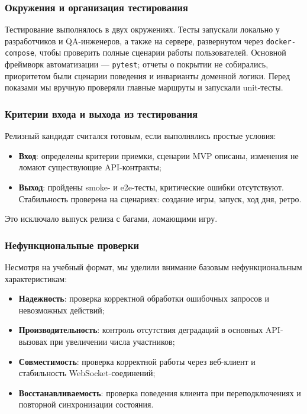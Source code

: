 \subsubsection{Окружения и организация тестирования}

Тестирование выполнялось в двух окружениях. Тесты запускали локально у разработчиков и QA-инженеров, а также на сервере, развернутом через \texttt{docker-compose}, чтобы проверить полные сценарии работы пользователей. Основной фреймворк автоматизации --- \texttt{pytest}; отчеты о покрытии не собирались, приоритетом были сценарии поведения и инварианты доменной логики. Перед показами мы вручную проверяли главные маршруты и запускали unit-тесты. 

\subsubsection{Критерии входа и выхода из тестирования} 
Релизный кандидат считался готовым, если выполнялись простые условия:

\begin{itemize}
    \item \textbf{Вход}: определены критерии приемки, сценарии MVP описаны, изменения не ломают существующие API-контракты;
    \item \textbf{Выход}: пройдены smoke- и e2e-тесты, критические ошибки отсутствуют. Стабильность проверена на сценариях: создание игры, запуск, ход дня, ретро.
\end{itemize} 
Это исключало выпуск релиза с багами, ломающими игру. 

\subsubsection{Нефункциональные проверки} 
Несмотря на учебный формат, мы уделили внимание базовым нефункциональным характеристикам:

\begin{itemize}
    \item \textbf{Надежность}: проверка корректной обработки ошибочных запросов и невозможных действий;
    \item \textbf{Производительность}: контроль отсутствия деградаций в основных API-вызовах при увеличении числа участников;
    \item \textbf{Совместимость}: проверка корректной работы через веб-клиент и стабильность WebSocket-соединений;
    \item \textbf{Восстанавливаемость}: проверка поведения клиента при переподключениях и повторной синхронизации состояния.
\end{itemize}

